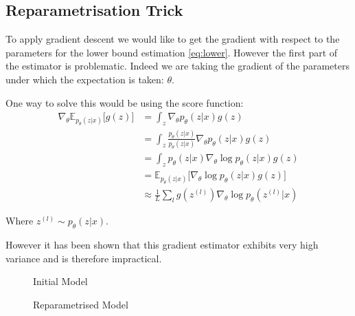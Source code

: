 \documentclass[11pt,oneside,openright]{report}
\begin{document}
\subsection{Reparametrisation Trick}
To apply gradient descent we would like to get the gradient with respect to the parameters for the lower bound estimation \ref{eq:lower}. However the first part of the estimator is problematic. Indeed we are taking the gradient of the parameters under which the expectation is taken: $\theta$.

One way to solve this would be using the score function:
 \begin{align}
\nabla_\theta \mathbb{E}_{p_\theta(z|x)}\big[ g(z) \big] &= \int_z \nabla_\theta p_\theta(z|x)  g(z)\\
 &= \int_z \frac{p_\theta(z|x)}{p_\theta(z|x)} \nabla_\theta p_\theta(z|x)  g(z) \\
 &= \int_z p_\theta(z|x) \nabla_\theta \log p_\theta(z|x)  g(z)\\
&= \mathbb{E}_{p_\theta(z|x)}\big[ \nabla_\theta \log p_\theta(z|x) g(z)  \big]\\
&\approx \frac{1}{L} \sum_l  g(z^{(l)}) \nabla_\theta \log p_\theta(z^{(l)}|x)
\end{align}

Where $z^{(l)} \sim p_\theta(z|x)$.

However it has been shown \cite{score} that this gradient estimator exhibits very high variance and is therefore impractical.

\begin{figure}[H]
    \centering
    \begin{minipage}{0.45\textwidth}
        \centering
{}
        \caption{Initial Model}
    \end{minipage}\hfill
    \begin{minipage}{0.45\textwidth}
        \centering
{}
        \caption{Reparametrised Model}
    \end{minipage}
\end{figure}
\end{document}
